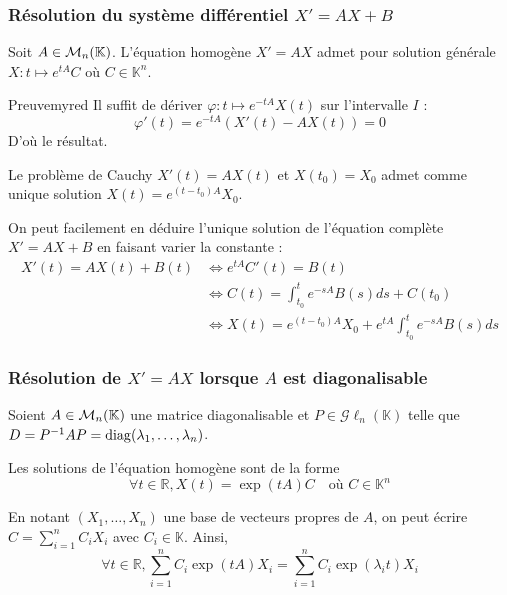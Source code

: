     \subsubsection{Résolution du système différentiel $X' = AX + B$}

    \begin{theo}{}{}
        Soit $A \in \mathcal{M}_{n}(\mathbb{K})$. L’équation homogène $X' = AX$ admet pour solution générale $X : t \mapsto e^{tA} C$ où $C \in \mathbb{K}^n$.
    \end{theo}

    \begin{demo}{Preuve}{myred}
        Il suffit de dériver $\varphi : t \mapsto e^{-tA}X(t)$ sur l’intervalle $I$ : 
        \[ \varphi'(t) = e^{-tA} \left(X'(t) - AX(t)\right) = 0 \] 
        D’où le résultat.
    \end{demo}

    Le problème de Cauchy $X'(t) = AX(t)$ et $X(t_0) = X_0$ admet comme unique solution $X(t) = e^{(t-t_0)A}X_0$. 

    On peut facilement en déduire l’unique solution de l’équation complète $X' = AX + B$ en faisant varier la constante : 
    \begin{align*}
        X'(t) = AX(t) + B(t) &\iff e^{tA} C'(t) = B(t) \\
        &\iff C(t) = \int_{t_0}^{t} e^{-sA} B(s)ds + C(t_0) \\
        &\iff X(t) = e^{(t-t_0)A} X_0 + e^{tA}\int_{t_0}^{t} e^{-sA} B(s)ds
    \end{align*}

    \subsubsection{Résolution de $X' = AX$ lorsque $A$ est diagonalisable}

    Soient $A \in \mathcal{M}_{n}(\mathbb{K})$ une matrice diagonalisable et $P \in \mathcal{G}\ell_n(\mathbb{K})$ telle que $D = P^{-1} A P = \operatorname{diag}(\lambda_1,\ldots,\lambda_n)$. 

    Les solutions de l’équation homogène sont de la forme 
    \[ \forall t \in \mathbb{R}, X(t) = \exp(tA)C \quad \text{où } C \in \mathbb{K}^n \] 

    En notant $(X_1,\ldots,X_n)$ une base de vecteurs propres de $A$, on peut écrire $C = \sum\limits_{i=1}^n C_i X_i$ avec $C_i \in \mathbb{K}$. Ainsi,
    \[ \forall t \in \mathbb{R}, \sum\limits_{i=1}^n C_i \exp(tA)X_i = \sum\limits_{i=1}^n C_i \exp(\lambda_i t)X_i \] 

